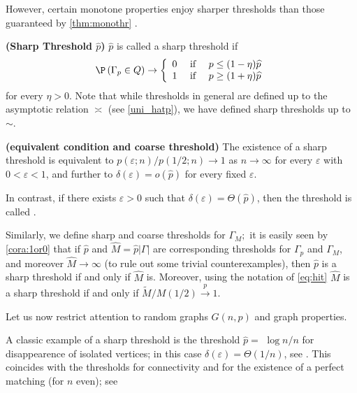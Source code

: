 \documentclass{article}
\newcommand{\bfs}[1]{\textbf{({#1}) }}
\begin{document}
However, certain monotone properties enjoy sharper thresholds than those guaranteed by \cref{thm:monothr} . 
\begin{defa}{\bfs{Sharp Threshold $ \widehat{p}$}}
$\widehat{p}$ is called a sharp threshold if 
\begin{align*}
\P \left(\Gamma_{p} \in Q \right) \rightarrow\left\{\begin{array}{lll}
0 & \text { if } & p \leq(1-\eta) \widehat{p} \\
1 & \text { if } & p \geq(1+\eta) \widehat{p}
\end{array}\right.
\end{align*}
for every $\eta>0$. Note that while thresholds in general are defined up to the asymptotic relation $\asymp$ (see \cref{uni_hatp}), we have defined sharp thresholds up to $\sim$. 
\end{defa}
\begin{rema}{\bfs{equivalent condition and coarse threshold}}
The existence of a sharp threshold is equivalent to $p(\varepsilon ; n) / p(1 / 2 ; n) \rightarrow 1$ as $n \rightarrow \infty$ for every $\varepsilon$ with $0<\varepsilon<1$, and further to $\delta(\varepsilon)=o(\widehat{p})$ for every fixed $\varepsilon$.

In contrast, if there exists $\varepsilon>0$ such that $\delta(\varepsilon)=\Theta(\widehat{p})$, then the threshold is called .
\end{rema}


Similarly, we define sharp and coarse thresholds for $\Gamma_{M} ;$ it is easily seen by \cref{cora:1or0} that if $\widehat{p}$ and $\widehat{M}=\widehat{p}|\Gamma|$ are corresponding thresholds for $\Gamma_{p}$ and $\Gamma_{M}$, and moreover $\widehat{M} \rightarrow \infty$ (to rule out some trivial counterexamples), then $\widehat{p}$ is a sharp threshold if and only if $\widehat{M}$ is. Moreover, using the notation of \cref{eq:hit} $\widehat{M}$ is a sharp threshold if and only if $\widetilde{M} / M(1 / 2) \stackrel{p}{\rightarrow} 1$.

 Let us now restrict attention to random graphs $G (n, p)$ and graph properties.

\begin{exma}\label{exm11}
 A classic example of a sharp threshold is the threshold $\widehat{p}=$ $\log n / n$ for disappearence of isolated vertices; in this case $\delta(\varepsilon)=\Theta(1 / n)$, see \cite[Corollary 3.31]{janson2011random}. This coincides with the thresholds for connectivity and for the existence of a perfect matching (for $n$ even); see \cite[ Chapter 4]{janson2011random}
\end{exma}
\end{document}
